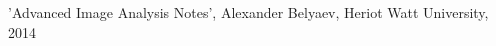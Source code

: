 \documentclass[a4paper, 10pt, conference] {article}
\begin{document}
%
%   	  	  	  	  
%    	
%    	
%  
  

\begin{thebibliography}{99}

'Advanced Image Analysis Notes', Alexander Belyaev, Heriot Watt University, 2014
\end{thebibliography}
\end{document}
